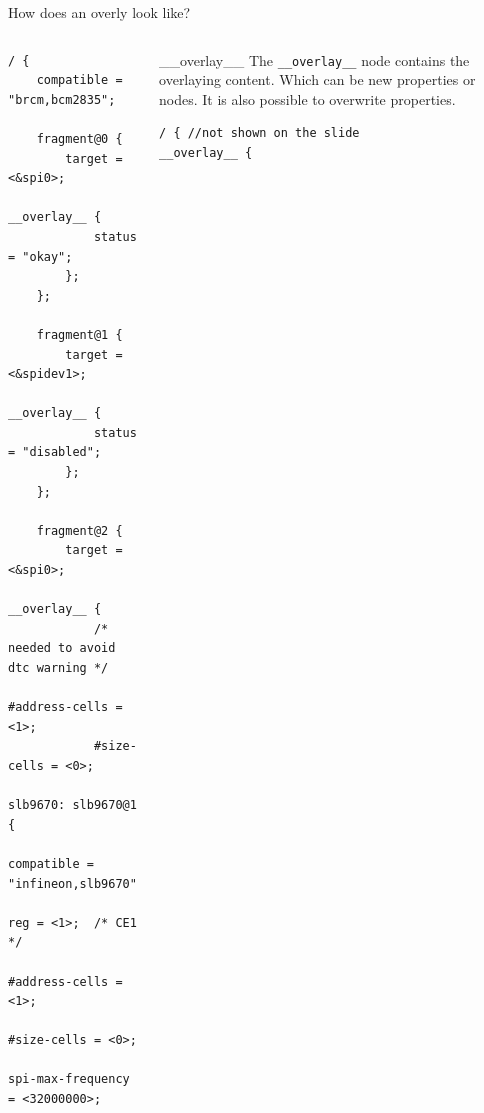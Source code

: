 \documentclass[aspectratio=169]{beamer}
\newcommand{\sectiontitle}{}
\begin{document}
\begin{frame}[fragile]{How does an overly look like?}{\sectiontitle}
    \begin{columns}[T]
        \begin{verbatim}
/ {
	compatible = "brcm,bcm2835";

	fragment@0 {
		target = <&spi0>;
		__overlay__ {
			status = "okay";
		};
	};

	fragment@1 {
		target = <&spidev1>;
		__overlay__ {
			status = "disabled";
		};
	};

	fragment@2 {
		target = <&spi0>;
		__overlay__ {
			/* needed to avoid dtc warning */
			#address-cells = <1>;
			#size-cells = <0>;
			slb9670: slb9670@1 {
				compatible = "infineon,slb9670";
				reg = <1>;	/* CE1 */
				#address-cells = <1>;
				#size-cells = <0>;
				spi-max-frequency = <32000000>;
        \end{verbatim}
        \begin{block}{\_\_overlay\_\_}
            The \verb|__overlay__| node contains the overlaying content. Which
            can be new properties or nodes. It is also possible to overwrite
            properties.
            \begin{verbatim}
/ { //not shown on the slide
__overlay__ {
            \end{verbatim}
        \end{block}
    \end{columns}
\end{frame}
\end{document}
